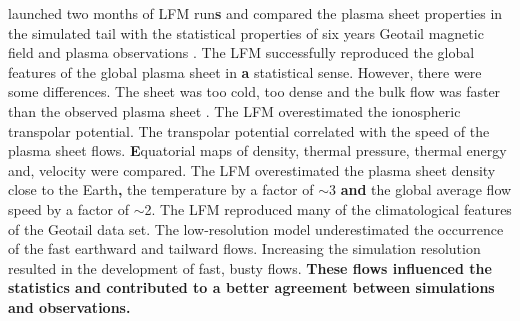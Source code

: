 \documentclass[linenumbers,draft]{agujournal}
\begin{document}
\citet{guild08:_geotail_lfm1,guild08:_geotail_lfm2} launched two months of LFM run\textbf{s} and compared the plasma sheet properties in the simulated tail with the statistical properties of six years Geotail magnetic field and plasma observations \citep{kokubun94:_geotail_magnet_field_exper,mukai94:_low_energ_partic_lep_exper_geotail_satel}. The LFM successfully reproduced the global features of the global plasma sheet in \textbf{a} statistical sense. However, there were some differences. The sheet was too cold, too dense and the bulk flow was faster than the observed plasma sheet \textbf{\citep{kokubun94:_geotail_magnet_field_exper,mukai94:_low_energ_partic_lep_exper_geotail_satel}}. The LFM overestimated the ionospheric transpolar potential. The transpolar potential correlated with the speed of the plasma sheet flows. \textbf{E}quatorial maps of density, thermal pressure, thermal energy and, velocity were compared. The LFM overestimated the plasma sheet density close to the Earth\textbf{,} the temperature by a factor of $\sim$3 \textbf{and} the global average flow speed by a factor of $\sim$2. The LFM reproduced many of the climatological features of the Geotail data set. The low-resolution model underestimated the occurrence of the fast earthward and tailward flows. Increasing the simulation resolution resulted in the development of fast, busty flows. \textbf{These flows influenced the statistics and contributed to a better agreement between simulations and observations.}
\end{document}
